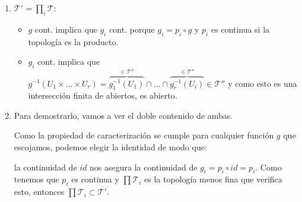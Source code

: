 \begin{demo}
\begin{enumerate}
    \item $\mathcal{T}' = \prod_{i} \mathcal{T}: $ 
    \begin{itemize}
        \item $g$ cont. implica que $g_i$ cont. porque $g_i = p_i \circ g$ y $p_i$ es continua si la topología es la producto.
        \item $g_i$ cont. implica que $g^{-1}\left( U_1 \times \ldots \times U_r \right) = \overbrace{g_1^{-1}\left( U_1 \right)}^{\in \mathcal{T}''} \cap \ldots \cap \overbrace{g_r^{-1}\left( U_i \right)}^{\in \mathcal{T}''} \in \mathcal{T}''$ y como esto es una intersección finita de abiertos, es abierto.
    \end{itemize}

    \item Para demostrarlo, vamos a ver el doble contenido de ambas.
    
    Como la propiedad de caracterización se cumple para cualquier función $g$ que escojamos, podemos elegir la identidad de modo que:
    \begin{figure}[H]
        \centering    
    \end{figure}
    la continuidad de $id$ nos asegura la continuidad de $g_i = p_i \circ id = p_i$. Como tenemos que $p_i$ es continua y $\prod \mathcal{T}_i$ es la topología menos fina que verifica esto, entonces $\prod \mathcal{T}_i \subset \mathcal{T}'$.
    

\end{enumerate}
\end{demo}
